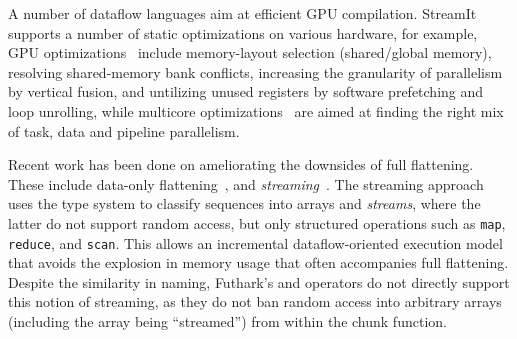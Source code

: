A number of dataflow languages aim at efficient GPU compilation.
StreamIt supports a number of static optimizations on various
hardware, for example, GPU
optimizations~\cite{Hormati:2011:SPS:1950365.1950409} include
memory-layout selection (shared/global memory), resolving
shared-memory bank conflicts, increasing the granularity of
parallelism by vertical fusion, and untilizing unused registers by
software prefetching and loop unrolling, while multicore
optimizations~\cite{Gordon:2006:ECT:1168857.1168877} are aimed at
finding the right mix of task, data and pipeline parallelism.

Recent work has been done on ameliorating the downsides of full
flattening.  These include data-only
flattening~\cite{Bergstrom:2013:DFN:2442516.2442525}, and
\textit{streaming}~\cite{madsen2016streaming}.  The streaming approach
uses the type system to classify sequences into arrays and
\textit{streams}, where the latter do not support random access, but
only structured operations such as \texttt{map}, \texttt{reduce}, and
\texttt{scan}.  This allows an incremental dataflow-oriented execution
model that avoids the explosion in memory usage that often accompanies
full flattening.  Despite the similarity in naming, Futhark's
\StreamMap{} and \StreamRed{} operators do not directly support this
notion of streaming, as they do not ban random access into arbitrary
arrays (including the array being ``streamed'') from within the chunk
function.

